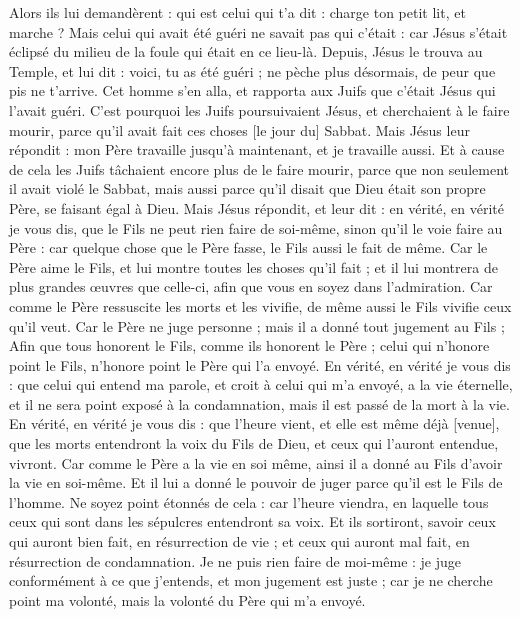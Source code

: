 \begin{multicols}{2}
Alors ils lui demandèrent : qui est celui qui t'a dit : charge ton petit lit, et marche ?
Mais celui qui avait été guéri ne savait pas qui c'était : car Jésus s'était éclipsé du milieu de la foule qui était en ce lieu-là.
Depuis, Jésus le trouva au Temple, et lui dit : voici, tu as été guéri ; ne pèche plus désormais, de peur que pis ne t'arrive.
Cet homme s'en alla, et rapporta aux Juifs que c'était Jésus qui l'avait guéri.
C'est pourquoi les Juifs poursuivaient Jésus, et cherchaient à le faire mourir, parce qu'il avait fait ces choses [le jour du] Sabbat.
Mais Jésus leur répondit : mon Père travaille jusqu'à maintenant, et je travaille aussi.
Et à cause de cela les Juifs tâchaient encore plus de le faire mourir, parce que non seulement il avait violé le Sabbat, mais aussi parce qu'il disait que Dieu était son propre Père, se faisant égal à Dieu.
Mais Jésus répondit, et leur dit : en vérité, en vérité je vous dis, que le Fils ne peut rien faire de soi-même, sinon qu'il le voie faire au Père : car quelque chose que le Père fasse, le Fils aussi le fait de même.
Car le Père aime le Fils, et lui montre toutes les choses qu'il fait ; et il lui montrera de plus grandes œuvres que celle-ci, afin que vous en soyez dans l'admiration.
Car comme le Père ressuscite les morts et les vivifie, de même aussi le Fils vivifie ceux qu'il veut.
Car le Père ne juge personne ; mais il a donné tout jugement au Fils ;
Afin que tous honorent le Fils, comme ils honorent le Père ; celui qui n'honore point le Fils, n'honore point le Père qui l'a envoyé.
En vérité, en vérité je vous dis : que celui qui entend ma parole, et croit à celui qui m'a envoyé, a la vie éternelle, et il ne sera point exposé à la condamnation, mais il est passé de la mort à la vie.
En vérité, en vérité je vous dis : que l'heure vient, et elle est même déjà [venue], que les morts entendront la voix du Fils de Dieu, et ceux qui l'auront entendue, vivront.
Car comme le Père a la vie en soi même, ainsi il a donné au Fils d'avoir la vie en soi-même.
Et il lui a donné le pouvoir de juger parce qu'il est le Fils de l'homme.
Ne soyez point étonnés de cela : car l'heure viendra, en laquelle tous ceux qui sont dans les sépulcres entendront sa voix.
Et ils sortiront, savoir ceux qui auront bien fait, en résurrection de vie ; et ceux qui auront mal fait, en résurrection de condamnation.
Je ne puis rien faire de moi-même : je juge conformément à ce que j'entends, et mon jugement est juste ; car je ne cherche point ma volonté, mais la volonté du Père qui m'a envoyé.

\end{multicols}

